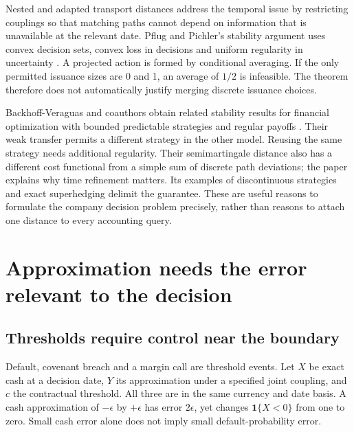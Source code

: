 \documentclass[11pt,a4paper]{article}
\newcommand{\ind}{\mathbf 1}
\begin{document}
Nested and adapted transport distances address the temporal issue by
restricting couplings so that matching paths cannot depend on information
that is unavailable at the relevant date. Pflug and Pichler's stability
argument uses convex decision sets, convex loss in decisions and uniform
regularity in uncertainty \cite[Definition~5.1, Theorem~6.1 and proof]{pflug}.
A projected action is formed by conditional averaging. If the only permitted
issuance sizes are 0 and 1, an average of $1/2$ is infeasible. The theorem
therefore does not automatically justify merging discrete issuance choices.

Backhoff-Veraguas and coauthors obtain related stability results for financial
optimization with bounded predictable strategies and regular payoffs
\cite[Theorem~1.5; Lemma~3.7; Theorem~3.10]{adapted}. Their weak transfer
permits a different strategy in the other model. Reusing the same strategy
needs additional regularity. Their semimartingale distance also has a
different cost functional from a simple sum of discrete path deviations; the
paper explains why time refinement matters. Its examples of discontinuous
strategies and exact superhedging delimit the guarantee. These are useful
reasons to formulate the company decision problem precisely, rather than
reasons to attach one distance to every accounting query.

\section{Approximation needs the error relevant to the decision}
\subsection{Thresholds require control near the boundary}
Default, covenant breach and a margin call are threshold events. Let $X$ be
exact cash at a decision date, $Y$ its approximation under a specified joint
coupling, and $c$ the contractual threshold. All three are in the same currency
and date basis. A cash approximation of $-\epsilon$ by $+\epsilon$ has error
$2\epsilon$, yet changes $\ind\{X<0\}$ from one to zero. Small cash error
alone does not imply small default-probability error.
\end{document}

